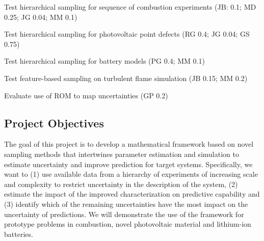 \documentclass[11pt]{article}
\begin{document}
\begin{compactitem}
\setlength{\itemsep}{0pt}\setlength{\parskip}{0pt}\setlength{\parsep}{0pt}
\item Test hierarchical sampling for sequence of combustion experiments
(JB: 0.1; MD 0.25; JG 0.04; MM 0.1)
\item Test hierarchical sampling for photovoltaic point defects
(RG 0.4; JG 0.04; GS 0.75)
\item Test hierarchical sampling for battery models
(PG 0.4; MM 0.1)
\item Test feature-based sampling on turbulent flame simulation
(JB 0.15; MM 0.2)
\item Evaluate use of ROM to map uncertainties
(GP 0.2)
\end{compactitem}

\subsection*{Project Objectives}

The goal of this project is to develop a mathematical framework  
based on novel sampling methods that
intertwines parameter estimation and simulation 
to estimate uncertainty and improve prediction for target systems.
Specifically, we want to
(1) use available data from a hierarchy
of experiments of increasing scale and complexity to restrict
uncertainty in the description of the system, (2) estimate the impact of the improved characterization
on predictive capability and (3) identify which of the remaining uncertainties have the most impact
on the uncertainty of predictions.
We will demonstrate the use of the framework for prototype problems in combustion,
novel photovoltaic material and lithium-ion batteries.




 
\end{document}
